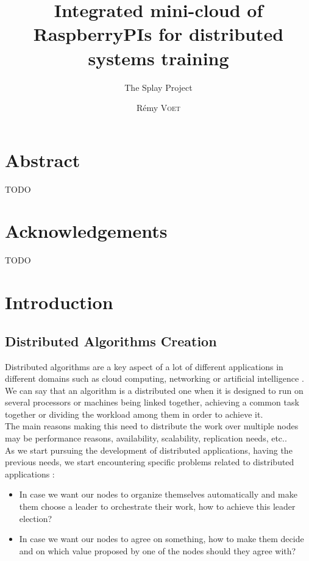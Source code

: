 \documentclass{eplmastersthesis}
\title{Integrated mini-cloud of RaspberryPIs for distributed systems training}
\subtitle{The Splay Project}
\author{Rémy \textsc{Voet}}
\begin{document}
  \maketitle

  \chapter*{Abstract}
  {\color{red} TODO}

  \chapter*{Acknowledgements}
  {\color{red} TODO}

  \tableofcontents

  \chapter{Introduction}

    \section{Distributed Algorithms Creation}

      Distributed algorithms are a key aspect of a lot of different
      applications in different domains such as cloud computing, networking
      or artificial intelligence \cite{DistributedArtificialIntelligence}.\\
      We can say that an algorithm is a distributed one when it is designed to
      run on several processors or machines being linked together, achieving
      a common task together or dividing the workload among them in order to
      achieve it.\\
      The main reasons making this need to distribute the work over multiple
      nodes may be performance reasons, availability, scalability, replication
      needs, etc..\\
      As we start pursuing the development of distributed applications, having
      the previous needs, we start encountering specific problems related to
      distributed applications :
      \begin{itemize}
        \item In case we want our nodes to organize themselves automatically and
        make them choose a leader to orchestrate their work, how to achieve
        this leader election?
        \item In case we want our nodes to agree on something, how to make
        them decide and on which value proposed by one of the nodes should they
        agree with?
      \end{itemize}
\end{document}
